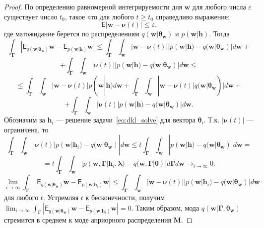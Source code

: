 \begin{proof}
По определению равномерной интегрируемости для $\mathbf{w}$ для любого числа $\varepsilon$ существует число $t_0$, такое что для любого $t \geq t_0$ справедливо выражение:
\[
    \mathsf{E}|\mathbf{w} - \boldsymbol{\nu}(t)| \leq \varepsilon.
\]
где матожидание берется по  распределениям  $q(\mathbf{w}|\boldsymbol{\theta}_\mathbf{w})$ и $p(\mathbf{w}|\mathbf{h})$.
Тогда 
\[
    \int_{\boldsymbol{\Gamma}} |\mathsf{E}_{q(\mathbf{w}|\boldsymbol{\theta}_\mathbf{w})}\mathbf{w}-\mathsf{E}_{p(\mathbf{w}|\mathbf{h})}\mathbf{w}| \leq     \int_{\boldsymbol{\Gamma}}  \int_{\mathbf{w}} |\mathbf{w} -\boldsymbol{\nu}(t)||p(\mathbf{w}|\mathbf{h})-q(\mathbf{w}|\boldsymbol{\theta}_\mathbf{w})|d\mathbf{w} + 
\]
\[
 +    \int_{\boldsymbol{\Gamma}}  \int_{\mathbf{w}} |\boldsymbol{\nu}(t)||p(\mathbf{w}|\mathbf{h})-q(\mathbf{w}|\boldsymbol{\theta}_\mathbf{w})|d\mathbf{w} \leq
\]
\[
    \leq     \int_{\boldsymbol{\Gamma}}  \int_{\mathbf{w}} |\mathbf{w} -\boldsymbol{\nu}(t)|p(\mathbf{w}|\mathbf{h}) d\mathbf{w} +    \int_{\boldsymbol{\Gamma}}  \int_{\mathbf{w}} |\mathbf{w} -\boldsymbol{\nu}(t)|q(\mathbf{w}|\boldsymbol{\theta}_\mathbf{w})|d\mathbf{w}  +
\]
\[ +      \int_{\boldsymbol{\Gamma}}  \int_{\mathbf{w}} |\boldsymbol{\nu}(t)|p(\mathbf{w}|\mathbf{h}) - q(\mathbf{w}|\boldsymbol{\theta}_\mathbf{w})|d\mathbf{w}.
\]
Обозначим за $\mathbf{h}_i$ --- решение задачи~\eqref{eq:dkl_solve} для вектора $\boldsymbol{\theta}_i$.
Т.к. $|\boldsymbol{\nu}(t)|$ --- ограничена, то 
\[
      \int_{\boldsymbol{\Gamma}}  \int_{\mathbf{w}} |\boldsymbol{\nu}(t)|p(\mathbf{w}|\mathbf{h}_i) - q(\mathbf{w}|\boldsymbol{\theta}_\mathbf{w})|d\mathbf{w} \leq t     \int_{\boldsymbol{\Gamma}}  \int_{\mathbf{w}} |p(\mathbf{w}|\mathbf{h}) - q(\mathbf{w}|\boldsymbol{\theta}_\mathbf{w})|d\mathbf{w} =
\]
\[
= t    \int_{\boldsymbol{\Gamma}}  \int_{\mathbf{w}} |p(\mathbf{w},\boldsymbol{\Gamma}| \mathbf{h}_i, \boldsymbol{\lambda}) -  q(\mathbf{w},\boldsymbol{\Gamma}|\boldsymbol{\theta})|d\boldsymbol{\Gamma}d\mathbf{w} \to_{i \to \infty} 0.
\]
\[
   \lim_{i \to \infty}     \int_{\boldsymbol{\Gamma}}  |\mathsf{E}_{q(\mathbf{w}|\boldsymbol{\theta}_\mathbf{w})}\mathbf{w}-\mathsf{E}_{p(\mathbf{w}|\mathbf{h}_i)}\mathbf{w}| \leq      \int_{\boldsymbol{\Gamma}}  \int_{\mathbf{w}} |\mathbf{w} -\boldsymbol{\nu}(t)||p(\mathbf{w}|\mathbf{h}_i)-q(\mathbf{w}|\boldsymbol{\theta}_\mathbf{w})|d\mathbf{w} 
\]
для любого $t$. Устремляя $t$ к бесконечности, получим $ \lim_{i \to \infty}     \int_{\boldsymbol{\Gamma}}  |\mathsf{E}_{q(\mathbf{w}|\boldsymbol{\theta}_\mathbf{w})}\mathbf{w}-\mathsf{E}_{p(\mathbf{w}|\mathbf{h}_i)}\mathbf{w}|  = 0.$
Таким образом, мода $q(\mathbf{w}|\boldsymbol{\Gamma}, \boldsymbol{\theta}_\mathbf{w})$  стремится в среднем к моде априорного распределения $\mathbf{M}$.

\end{proof}


